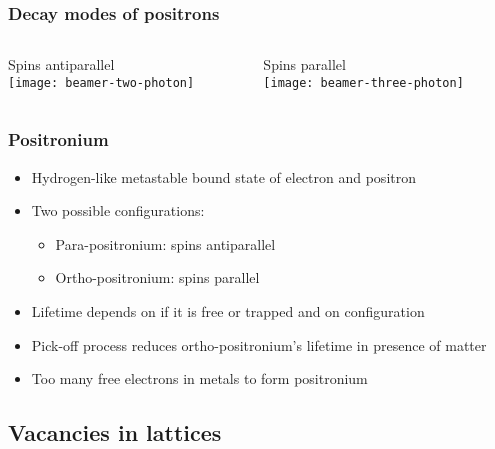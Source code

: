 \documentclass[english, fleqn]{beamer}
\begin{document}
\begin{frame}
    \frametitle{Decay modes of positrons}

    \begin{columns}[T]
        \begin{column}{.5\textwidth}
            Spins antiparallel\\
            \vspace{1cm}
            \centering
            \texttt{[image: beamer-two-photon]}
        \end{column}
        \begin{column}{.5\textwidth}
            Spins parallel\\
            \centering
            \texttt{[image: beamer-three-photon]}
        \end{column}
    \end{columns}
\end{frame}

\begin{frame}
    \frametitle{Positronium}
    \begin{itemize}
        \item
            Hydrogen-like metastable bound state of electron and positron
        \item
            Two possible configurations:
            \begin{itemize}
                \item
                    Para-positronium: spins antiparallel
                \item
                    Ortho-positronium: spins parallel
            \end{itemize}
        \item
            Lifetime depends on if it is free or trapped and on configuration 
        \item
            Pick-off process reduces ortho-positronium's lifetime in presence of matter
        \item
            Too many free electrons in metals to form positronium
    \end{itemize}
\end{frame}

\subsection{Vacancies in lattices}
\end{document}
